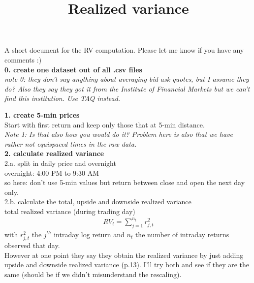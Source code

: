 \documentclass{article}
\title{Realized variance}
\begin{document}
\maketitle

A short document for the RV computation. Please let me know if you have any comments :)\\

\textbf{0. create one dataset out of all .csv files}\\

\textit{note 0: they don't say anything about averaging bid-ask quotes, but I assume they do? Also they say they got it from the Institute of Financial Markets but we can't find this institution. Use TAQ instead.}

\textbf{1. create 5-min prices}\\

Start with first return and keep only those that at 5-min distance.\\

\textit{Note 1: Is that also how you would do it? Problem here is also that we have rather not equispaced times in the raw data.}\\

\textbf{2. calculate realized variance}\\

2.a. split in daily price and overnight\\

overnight: 4:00 PM to 9:30 AM\\ 

so here: don't use 5-min values but return between close and open the next day only.\\

2.b. calculate the total, upside and downside realized variance\\

total realized variance (during trading day)
\begin{align*}
RV_{t} = \sum_{j = 1}^{n_{t}} r_{j,t}^{2}
\end{align*}
with $r_{j,t}^{2}$ the $j^{th}$ intraday log return and $n_{t}$ the number of intraday returns observed that day. \\

However at one point they say they obtain the realized variance by just adding upside and downside realized variance (p.13). I'll try both and see if they are the same (should be if we didn't misunderstand the rescaling). \\
\end{document}

